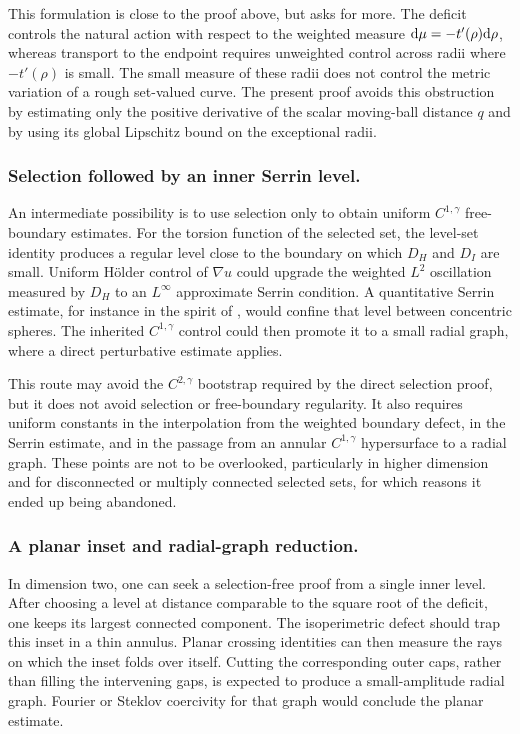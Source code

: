 \documentclass[11pt]{amsart}
\theoremstyle{plain}
\theoremstyle{definition}
\def\dd{{\rm d}}
\begin{document}
This formulation is close to the proof above, but asks for more. The deficit
controls the natural action with respect to the weighted measure
$\dd\mu=-t'(\rho)\dd\rho$, whereas transport to the endpoint requires
unweighted control across radii where $-t'(\rho)$ is small. The small measure
of these radii does not control the metric variation of a rough set-valued
curve. The present proof avoids this obstruction by estimating only the
positive derivative of the scalar moving-ball distance $q$ and by using its
global Lipschitz bound on the exceptional radii. 

\subsubsection{Selection followed by an inner Serrin level.}
An intermediate possibility is to use selection only to obtain uniform
$C^{1,\gamma}$ free-boundary estimates. For the torsion function of the
selected set, the level-set identity produces a regular level close to the
boundary on which $D_H$ and $D_I$ are small. Uniform H\"older control of
$\nabla u$ could upgrade the weighted $L^2$ oscillation measured by $D_H$ to
an $L^\infty$ approximate Serrin condition. A quantitative Serrin estimate,
for instance in the spirit of
\cite{BrandoliniNitschSalaniTrombetti2008}, would confine that level between
concentric spheres. The inherited $C^{1,\gamma}$ control could then promote
it to a small radial graph, where a direct perturbative estimate applies.

This route may avoid the $C^{2,\gamma}$ bootstrap required by the direct
selection proof, but it does not avoid selection or free-boundary
regularity. It also requires uniform constants in the interpolation from the
weighted boundary defect, in the Serrin estimate, and in the passage from an
annular $C^{1,\gamma}$ hypersurface to a radial graph. These points are
not to be overlooked, particularly in higher dimension and for disconnected or
multiply connected selected sets, for which reasons it ended up being abandoned. 

\subsubsection{A planar inset and radial-graph reduction.}
In dimension two, one can seek a selection-free proof from a single inner
level. After choosing a level at distance comparable to the square root of
the deficit, one keeps its largest connected component. The isoperimetric
defect should trap this inset in a thin annulus. Planar crossing identities
can then measure the rays on which the inset folds over itself. Cutting the
corresponding outer caps, rather than filling the intervening gaps, is
expected to produce a small-amplitude radial graph. Fourier or Steklov
coercivity for that graph would conclude the planar estimate.
\end{document}
